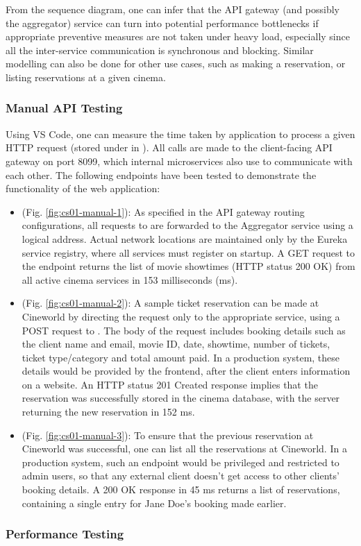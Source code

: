 From the sequence diagram, one can infer that the API gateway (and possibly the aggregator) service can turn into potential performance bottlenecks if appropriate preventive measures are not taken under heavy load, especially since all the inter-service communication is synchronous and blocking. Similar modelling can also be done for other use cases, such as making a reservation, or listing reservations at a given cinema.

\subsubsection{Manual API Testing}

Using VS Code, one can measure the time taken by application to process a given HTTP request (stored under  in ). All calls are made to the client-facing API gateway on port 8099, which internal microservices also use to communicate with each other. The following endpoints have been tested to demonstrate the functionality of the web application:

\begin{itemize}
	\item {} (Fig. \ref{fig:cs01-manual-1}): As specified in the API gateway routing configurations, all requests to  are forwarded to the Aggregator service using a logical address. Actual network locations are maintained only by the Eureka service registry, where all services must register on startup. A GET request to the  endpoint returns the list of movie showtimes (HTTP status 200 OK) from all active cinema services in 153 milliseconds (ms).

	\item {} (Fig. \ref{fig:cs01-manual-2}): A sample ticket reservation can be made at Cineworld by directing the request only to the appropriate service, using a POST request to . The body of the request includes booking details such as the client name and email, movie ID, date, showtime, number of tickets, ticket type/category and total amount paid. In a production system, these details would be provided by the frontend, after the client enters information on a website. An HTTP status 201 Created response implies that the reservation was successfully stored in the cinema database, with the server returning the new reservation in 152 ms.

	\item {} (Fig. \ref{fig:cs01-manual-3}): To ensure that the previous reservation at Cineworld was successful, one can list all the reservations at Cineworld. In a production system, such an endpoint would be privileged and restricted to admin users, so that any external client doesn't get access to other clients' booking details. A 200 OK response in 45 ms returns a list of reservations, containing a single entry for Jane Doe's booking made earlier.
\end{itemize}


\subsubsection{Performance Testing}
